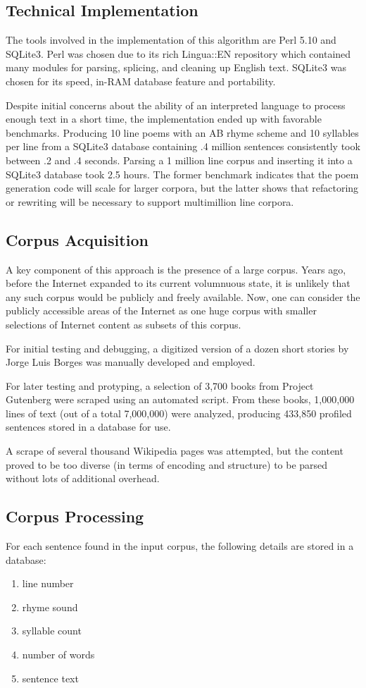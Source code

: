 \documentclass[10pt]{article}
\begin{document}
\subsection{Technical Implementation}
The tools involved in the implementation of this algorithm are Perl 5.10 and
SQLite3. Perl was chosen due to its rich Lingua::EN repository which contained
many modules for parsing, splicing, and cleaning up English text. SQLite3 was
chosen for its speed, in-RAM database feature and portability.

Despite initial concerns about the ability of an interpreted language to
process enough text in a short time, the implementation ended up with favorable
benchmarks. Producing 10 line poems with an AB rhyme scheme and 10 syllables
per line from a SQLite3 database containing .4 million sentences consistently
took between .2 and .4 seconds. Parsing a 1 million line corpus and inserting
it into a SQLite3 database took 2.5 hours.  The former benchmark indicates that
the poem generation code will scale for larger corpora, but the latter shows
that refactoring or rewriting will be necessary to support multimillion line
corpora.

\subsection{Corpus Acquisition}
A key component of this approach is the presence of a large corpus. Years ago,
before the Internet expanded to its current volumnuous state, it is unlikely
that any such corpus would be publicly and freely available. Now, one can
consider the publicly accessible areas of the Internet as one huge corpus with
smaller selections of Internet content as subsets of this corpus.

For initial testing and debugging, a digitized version of a dozen short stories
by Jorge Luis Borges was manually developed and employed.

For later testing and protyping, a selection of 3,700 books from Project
Gutenberg were scraped using an automated script. From these books, 1,000,000
lines of text (out of a total 7,000,000) were analyzed, producing 433,850
profiled sentences stored in a database for use.

A scrape of several thousand Wikipedia pages was attempted, but the content
proved to be too diverse (in terms of encoding and structure) to be parsed
without lots of additional overhead.

\subsection{Corpus Processing}
For each sentence found in the input corpus, the following details are stored in a database:
\begin{enumerate}
\item line number
\item rhyme sound
\item syllable count
\item number of words
\item sentence text
\end{enumerate}
\end{document}

